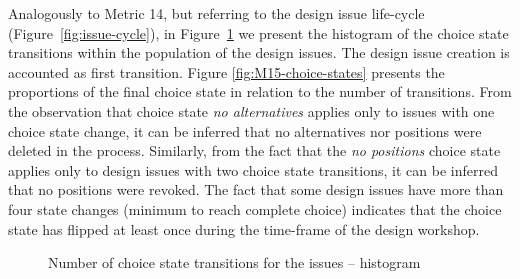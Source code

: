 \documentclass[article]{elsarticle}
\begin{document}
Analogously to Metric 14, but referring to the design issue life-cycle (Figure~\ref{fig:issue-cycle}), in Figure~\ref{fig:M15-histogram} we present the histogram of the choice state transitions within the population of the design issues. The design issue creation is accounted as first transition. Figure \ref{fig:M15-choice-states} presents the proportions of the final choice state in relation to the number of transitions. From the observation that choice state \emph{no alternatives} applies only to issues with one choice state change, it can be inferred that no alternatives nor positions were deleted in the process. Similarly, from the fact that the \emph{no positions} choice state applies only to design issues with two choice state transitions, it can be inferred that no positions were revoked. The fact that some design issues have more than four state changes (minimum to reach complete choice) indicates that the choice state has flipped at least once during the time-frame of the design workshop. 

\begin{figure}
  \begin{center}

  \caption{Number of choice state transitions for the issues -- histogram}
  \label{fig:M15-histogram}
  \end{center}
\end{figure}
\end{document}
